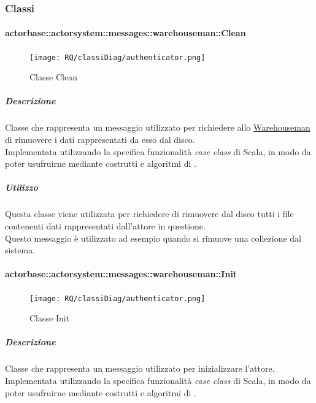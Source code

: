 \documentclass{scalatekids-article}
\begin{document}
\subsubsection{Classi}

\paragraph{actorbase::actorsystem::messages::warehouseman::Clean}
\label{sec:actorbase::actorsystem::messages::warehouseman::Clean}

\begin{figure}[H]
  \begin{center}
    \texttt{[image: RQ/classiDiag/authenticator.png]}
    \caption{Classe Clean}
  \end{center}
\end{figure}

\subparagraph{Descrizione}
Classe che rappresenta un messaggio utilizzato per richiedere allo
\hyperref[sec:actorbase::actorsystem::actors::warehouseman::Warehouseman]{Warehouseman} di rimuovere i dati rappresentati da esso dal disco.\\Implementata utilizzando la specifica funzionalità \textit{case class} di Scala,
in modo da poter usufruirne mediante costrutti e algoritmi di
.

\subparagraph{Utilizzo}
Questa classe viene utilizzata per richiedere di rimuovere dal disco tutti i
file contenenti dati rappresentati dall'attore in questione.\\Questo messaggio
è utilizzato ad esempio quando si rimuove una collezione dal sistema.

\paragraph{actorbase::actorsystem::messages::warehouseman::Init}
\label{sec:actorbase::actorsystem::messages::warehouseman::Init}

\begin{figure}[H]
  \begin{center}
    \texttt{[image: RQ/classiDiag/authenticator.png]}
    \caption{Classe Init}
  \end{center}
\end{figure}

\subparagraph{Descrizione}
Classe che rappresenta un messaggio utilizzato per inizializzare l'attore.\\Implementata utilizzando la specifica funzionalità \textit{case class} di Scala,
in modo da poter usufruirne mediante costrutti e algoritmi di
.
\end{document}

